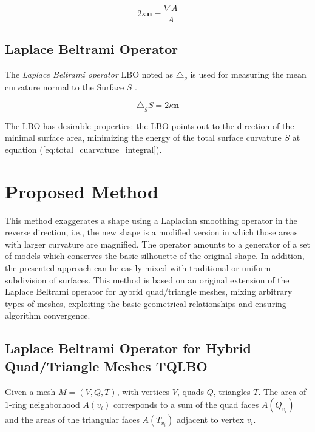 \documentclass[10pt, conference]{IEEEtran}
\begin{document}
\begin{equation}
2\kappa\mathbf{n}=\frac{\nabla A}{A}\label{eq:discrete_mean_curvature_normal}
\end{equation}



\subsection{Laplace Beltrami Operator}

The \textit{Laplace Beltrami operator} LBO noted as $\triangle_{g}$
is used for measuring the mean curvature normal to the Surface $S$
\cite{Pinkall1993}. 

\begin{equation}
\triangle_{g}S=2\kappa\mathbf{n}\label{eq:def_LBO}
\end{equation}


The LBO has desirable properties: the LBO points out to the direction
of the minimal surface area, minimizing the energy of the total surface
curvature $S$ at equation (\ref{eq:total_cuarvature_integral}).


\section{Proposed Method\label{sec:Proposed-Method}}

This method exaggerates a shape using a Laplacian smoothing operator
in the reverse direction, i.e., the new shape is a modified version
in which those areas with larger curvature are magnified. The operator
amounts to a generator of a set of models which conserves the basic
silhouette of the original shape. In addition, the presented approach
can be easily mixed with traditional or uniform subdivision of surfaces.
This method is based on an original extension of the Laplace Beltrami
operator for hybrid quad/triangle meshes, mixing arbitrary types of
meshes, exploiting the basic geometrical relationships and ensuring
algorithm convergence. 


\subsection{Laplace Beltrami Operator for Hybrid Quad/Triangle Meshes TQLBO\label{sub:Laplace-Beltrami-operator}}

Given a mesh $M=\left(V,Q,T\right)$, with vertices $V$, quads $Q$,
triangles $T$. The area of $1$-ring neighborhood $A\left(v_{i}\right)$
corresponds to a sum of the quad faces $A\left(Q_{v_{i}}\right)$
and the areas of the triangular faces $\ensuremath{A\left(T_{v_{i}}\right)}$
adjacent to vertex $\ensuremath{v_{i}}$.
\end{document}
